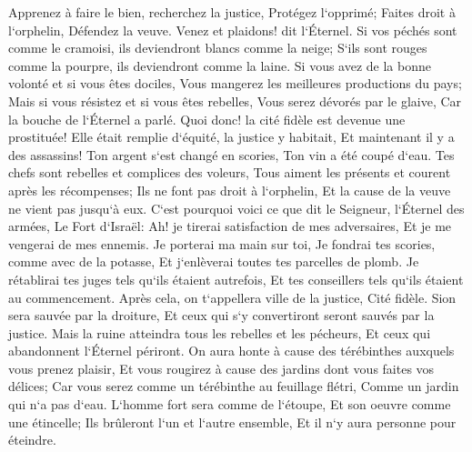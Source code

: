 \verse Apprenez à faire le bien, recherchez la justice, Protégez l`opprimé; Faites droit à l`orphelin, Défendez la veuve. 
\verse Venez et plaidons! dit l`Éternel. Si vos péchés sont comme le cramoisi, ils deviendront blancs comme la neige; S`ils sont rouges comme la pourpre, ils deviendront comme la laine. 
\verse Si vous avez de la bonne volonté et si vous êtes dociles, Vous mangerez les meilleures productions du pays; 
\verse Mais si vous résistez et si vous êtes rebelles, Vous serez dévorés par le glaive, Car la bouche de l`Éternel a parlé. 
\verse Quoi donc! la cité fidèle est devenue une prostituée! Elle était remplie d`équité, la justice y habitait, Et maintenant il y a des assassins! 
\verse Ton argent s`est changé en scories, Ton vin a été coupé d`eau. 
\verse Tes chefs sont rebelles et complices des voleurs, Tous aiment les présents et courent après les récompenses; Ils ne font pas droit à l`orphelin, Et la cause de la veuve ne vient pas jusqu`à eux. 
\verse C`est pourquoi voici ce que dit le Seigneur, l`Éternel des armées, Le Fort d`Israël: Ah! je tirerai satisfaction de mes adversaires, Et je me vengerai de mes ennemis. 
\verse Je porterai ma main sur toi, Je fondrai tes scories, comme avec de la potasse, Et j`enlèverai toutes tes parcelles de plomb. 
\verse Je rétablirai tes juges tels qu`ils étaient autrefois, Et tes conseillers tels qu`ils étaient au commencement. Après cela, on t`appellera ville de la justice, Cité fidèle. 
\verse Sion sera sauvée par la droiture, Et ceux qui s`y convertiront seront sauvés par la justice. 
\verse Mais la ruine atteindra tous les rebelles et les pécheurs, Et ceux qui abandonnent l`Éternel périront. 
\verse On aura honte à cause des térébinthes auxquels vous prenez plaisir, Et vous rougirez à cause des jardins dont vous faites vos délices; 
\verse Car vous serez comme un térébinthe au feuillage flétri, Comme un jardin qui n`a pas d`eau. 
\verse L`homme fort sera comme de l`étoupe, Et son oeuvre comme une étincelle; Ils brûleront l`un et l`autre ensemble, Et il n`y aura personne pour éteindre. 

